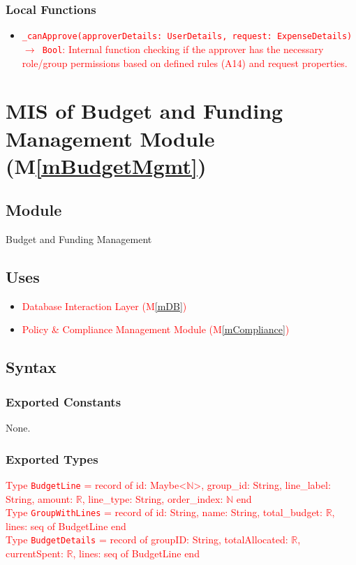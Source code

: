 \documentclass[12pt, titlepage]{article}
\providecommand{\mref}[1]{M\ref{#1}}
\begin{document}
\subsubsection{Local Functions}
\begin{itemize}
    \item \textcolor{red}{\texttt{\_canApprove(approverDetails: UserDetails, request: ExpenseDetails) $\rightarrow$ Bool}: Internal function checking if the approver has the necessary role/group permissions based on defined rules (A14) and request properties.}
\end{itemize}

\section{MIS of Budget and Funding Management Module (\mref{mBudgetMgmt})}

\subsection{Module}
Budget and Funding Management

\subsection{Uses}
\begin{itemize}
    \item \textcolor{red}{Database Interaction Layer (\mref{mDB})}
    \item \textcolor{red}{Policy \& Compliance Management Module (\mref{mCompliance})} %
\end{itemize}

\subsection{Syntax}
\subsubsection{Exported Constants}
None.

\subsubsection{Exported Types} %
\textcolor{red}{Type \texttt{BudgetLine} = record of id: Maybe<$\mathbb{N}$>, group\_id: String, line\_label: String, amount: $\mathbb{R}$, line\_type: String, order\_index: $\mathbb{N}$ end} \\
\textcolor{red}{Type \texttt{GroupWithLines} = record of id: String, name: String, total\_budget: $\mathbb{R}$, lines: seq of BudgetLine end} \\
\textcolor{red}{Type \texttt{BudgetDetails} = record of groupID: String, totalAllocated: $\mathbb{R}$, currentSpent: $\mathbb{R}$, lines: seq of BudgetLine end}
\end{document}
